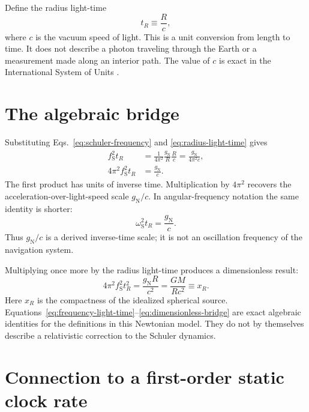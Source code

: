 \documentclass[12pt]{article}
\begin{document}
Define the radius light-time
\begin{equation}
  t_R\equiv\frac{R}{c},
  \label{eq:radius-light-time}
\end{equation}
where $c$ is the vacuum speed of light. This is a unit conversion from length to time. It does not describe a photon traveling through the Earth or a measurement made along an interior path. The value of $c$ is exact in the International System of Units \cite{BIPM}.

\section{The algebraic bridge}

Substituting Eqs.~\eqref{eq:schuler-frequency} and \eqref{eq:radius-light-time} gives
\begin{align}
  f_{\mathrm{S}}^2t_R
  &=\frac{1}{4\pi^2}\frac{g_{\mathrm{N}}}{R}\frac{R}{c}
   =\frac{g_{\mathrm{N}}}{4\pi^2c},
  \label{eq:frequency-light-time}\\
  4\pi^2 f_{\mathrm{S}}^2t_R
  &=\frac{g_{\mathrm{N}}}{c}.
  \label{eq:acceleration-frequency-scale}
\end{align}
The first product has units of inverse time. Multiplication by $4\pi^2$ recovers the acceleration-over-light-speed scale $g_{\mathrm{N}}/c$. In angular-frequency notation the same identity is shorter:
\begin{equation}
  \omega_{\mathrm{S}}^2t_R
  =\frac{g_{\mathrm{N}}}{c}.
  \label{eq:angular-frequency-scale}
\end{equation}
Thus $g_{\mathrm{N}}/c$ is a derived inverse-time scale; it is not an oscillation frequency of the navigation system.

Multiplying once more by the radius light-time produces a dimensionless result:
\begin{equation}
  4\pi^2 f_{\mathrm{S}}^2t_R^2
  =\frac{g_{\mathrm{N}}R}{c^2}
  =\frac{GM}{Rc^2}
  \equiv x_R.
  \label{eq:dimensionless-bridge}
\end{equation}
Here $x_R$ is the compactness of the idealized spherical source. Equations~\eqref{eq:frequency-light-time}--\eqref{eq:dimensionless-bridge} are exact algebraic identities for the definitions in this Newtonian model. They do not by themselves describe a relativistic correction to the Schuler dynamics.

\section{Connection to a first-order static clock rate}
\end{document}
